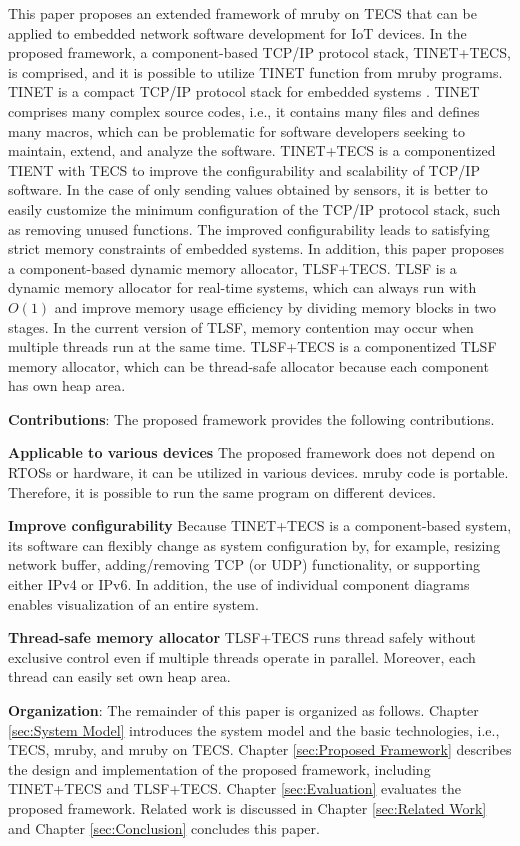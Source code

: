 \documentclass[a4j,12pt,oneside,openany,english]{jsbook}
\begin{document}
This paper proposes an extended framework of mruby on TECS that can be applied to embedded network software development for IoT devices.
In the proposed framework, a component-based TCP/IP protocol stack, TINET+TECS, is comprised, and it is possible to utilize TINET function from mruby programs.
TINET is a compact TCP/IP protocol stack for embedded systems \cite{url:TINET}.
TINET comprises many complex source codes, i.e., it contains many files and defines many macros, which can be problematic for software developers seeking to maintain, extend, and analyze the software.
TINET+TECS is a componentized TIENT with TECS to improve the configurability and scalability of TCP/IP software.
In the case of only sending values obtained by sensors, it is better to easily customize the minimum configuration of the TCP/IP protocol stack, such as removing unused functions.
The improved configurability leads to satisfying strict memory constraints of embedded systems.
In addition, this paper proposes a component-based dynamic memory allocator, TLSF+TECS. 
TLSF is a dynamic memory allocator for real-time systems, which can always run with $O(1)$ and improve memory usage efficiency by dividing memory blocks in two stages.
In the current version of TLSF, memory contention may occur when multiple threads run at the same time.
TLSF+TECS is a componentized TLSF memory allocator, which can be thread-safe allocator because each component has own heap area.



{\bf Contributions}: The proposed framework provides the following contributions.

{\bf Applicable to various devices}
The proposed framework does not depend on RTOSs or hardware, it can be utilized in various devices.
mruby code is portable.
Therefore, it is possible to run the same program on different devices.

{\bf Improve configurability}
Because TINET+TECS is a component-based system, its software can flexibly change as system configuration by, for example, resizing network buffer, adding/removing TCP (or UDP) functionality, or supporting either IPv4 or IPv6.
In addition, the use of individual component diagrams enables visualization of an entire system.

{\bf Thread-safe memory allocator}
TLSF+TECS runs thread safely without exclusive control even if multiple threads operate in parallel.
Moreover, each thread can easily set own heap area.

{\bf Organization}: The remainder of this paper is organized as follows.
Chapter \ref{sec:System Model} introduces the system model and the basic technologies, i.e., TECS, mruby, and mruby on TECS.
Chapter \ref{sec:Proposed Framework} describes the design and implementation of the proposed framework, including TINET+TECS and TLSF+TECS.
Chapter \ref{sec:Evaluation} evaluates the proposed framework.
Related work is discussed in Chapter \ref{sec:Related Work} and Chapter \ref{sec:Conclusion} concludes this paper.
\end{document}
